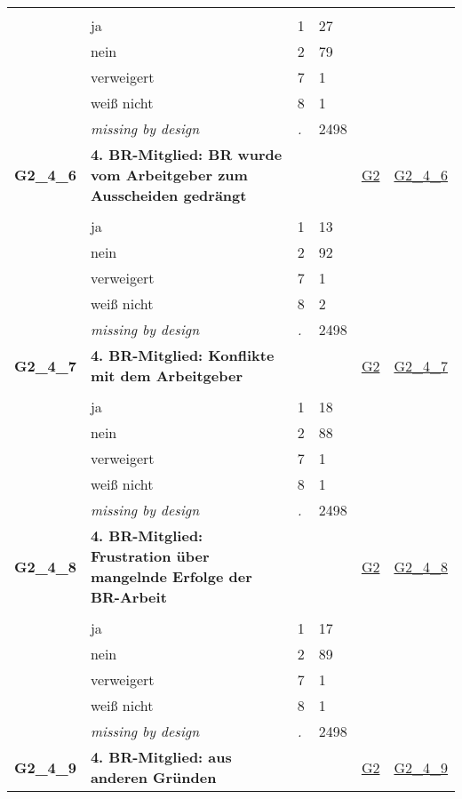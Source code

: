 \begin{longtable}{| L{2.45cm} | L{6cm} | C{1.5cm} | R{1cm} | C{2.25cm} | C{2.25cm} |}
   &  &  &  &  &  \\ 
   & ja & 1 & 27 &  &  \\ 
   & nein & 2 & 79 &  &  \\ 
   & verweigert & 7 & 1 &  &  \\ 
   & weiß nicht & 8 & 1 &  &  \\ 
   & \textit{missing by design} & \textit{.} & 2498 &  &  \\ 
   \midrule
\textbf{G2\_4\_6}\label{var:G2:4:6} & \textbf{4. BR-Mitglied: BR wurde vom Arbeitgeber zum Ausscheiden gedrängt} &  &  & \hyperref[G2]{G2} & \hyperref[var:suf:G2:4:6]{G2\_4\_6} \\ 
   &  &  &  &  &  \\ 
   & ja & 1 & 13 &  &  \\ 
   & nein & 2 & 92 &  &  \\ 
   & verweigert & 7 & 1 &  &  \\ 
   & weiß nicht & 8 & 2 &  &  \\ 
   & \textit{missing by design} & \textit{.} & 2498 &  &  \\ 
   \midrule
\textbf{G2\_4\_7}\label{var:G2:4:7} & \textbf{4. BR-Mitglied: Konflikte mit dem Arbeitgeber} &  &  & \hyperref[G2]{G2} & \hyperref[var:suf:G2:4:7]{G2\_4\_7} \\ 
   &  &  &  &  &  \\ 
   & ja & 1 & 18 &  &  \\ 
   & nein & 2 & 88 &  &  \\ 
   & verweigert & 7 & 1 &  &  \\ 
   & weiß nicht & 8 & 1 &  &  \\ 
   & \textit{missing by design} & \textit{.} & 2498 &  &  \\ 
   \midrule
\textbf{G2\_4\_8}\label{var:G2:4:8} & \textbf{4. BR-Mitglied: Frustration über mangelnde Erfolge der BR-Arbeit} &  &  & \hyperref[G2]{G2} & \hyperref[var:suf:G2:4:8]{G2\_4\_8} \\ 
   &  &  &  &  &  \\ 
   & ja & 1 & 17 &  &  \\ 
   & nein & 2 & 89 &  &  \\ 
   & verweigert & 7 & 1 &  &  \\ 
   & weiß nicht & 8 & 1 &  &  \\ 
   & \textit{missing by design} & \textit{.} & 2498 &  &  \\ 
   \midrule
\textbf{G2\_4\_9}\label{var:G2:4:9} & \textbf{4. BR-Mitglied: aus anderen Gründen} &  &  & \hyperref[G2]{G2} & \hyperref[var:suf:G2:4:9]{G2\_4\_9} \\ 

\end{longtable}
